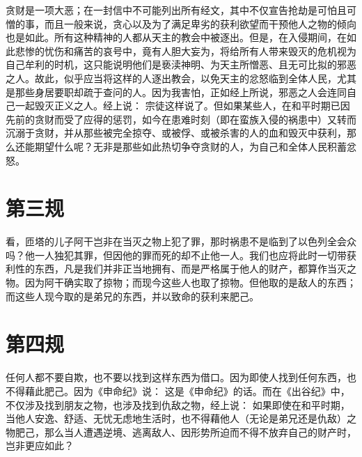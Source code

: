 贪财是一项大恶；在一封信中不可能列出所有经文，其中不仅宣告抢劫是可怕且可憎的事，而且一般来说，贪心以及为了满足卑劣的获利欲望而干预他人之物的倾向也是如此。所有这种精神的人都从天主的教会中被逐出。但是，在入侵期间，在如此悲惨的忧伤和痛苦的哀号中，竟有人胆大妄为，将给所有人带来毁灭的危机视为自己牟利的时机，这只能说明他们是亵渎神明、为天主所憎恶、且无可比拟的邪恶之人。故此，似乎应当将这样的人逐出教会，以免天主的忿怒临到全体人民，尤其是那些身居要职却疏于查问的人。因为我害怕，正如经上所说，邪恶之人会连同自己一起毁灭正义之人。经上说： 宗徒这样说了。但如果某些人，在和平时期已因先前的贪财而受了应得的惩罚，如今在患难时刻（即在蛮族入侵的祸患中）又转而沉溺于贪财，并从那些被完全掠夺、或被俘、或被杀害的人的血和毁灭中获利，那么还能期望什么呢？无非是那些如此热切争夺贪财的人，为自己和全体人民积蓄忿怒。\par


\section{第三规}

看，匝塔的儿子阿干岂非在当灭之物上犯了罪，那时祸患不是临到了以色列全会众吗？他一人独犯其罪，但因他的罪而死的却不止他一人。我们也应将此时一切带获利性的东西，凡是我们并非正当地拥有、而是严格属于他人的财产，都算作当灭之物。因为阿干确实取了掠物；而现今这些人也取了掠物。但他取的是敌人的东西；而这些人现今取的是弟兄的东西，并以致命的获利来肥己。\par


\section{第四规}

任何人都不要自欺，也不要以找到这样东西为借口。因为即使人找到任何东西，也不得藉此肥己。因为《申命纪》说： 这是《申命纪》的话。而在《出谷纪》中，不仅涉及找到朋友之物，也涉及找到仇敌之物，经上说： 如果即使在和平时期，当他人安逸、舒适、无忧无虑地生活时，也不得藉他人（无论是弟兄还是仇敌）之物肥己，那么当人遭遇逆境、逃离敌人、因形势所迫而不得不放弃自己的财产时，岂非更应如此？\par

